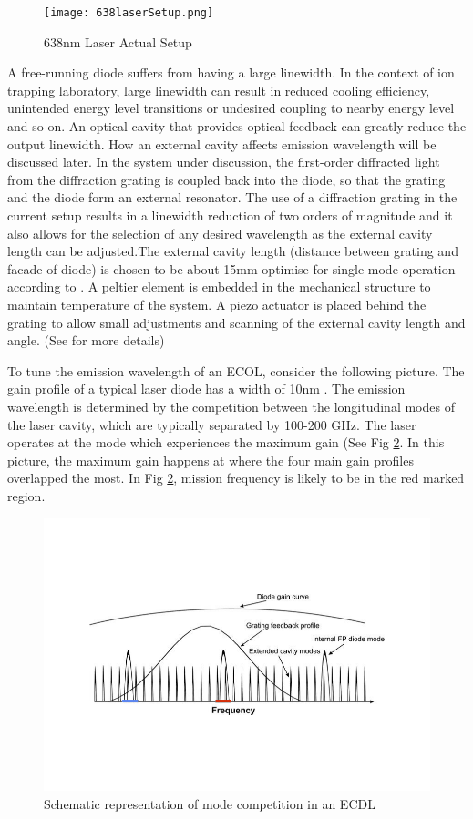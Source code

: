 \documentclass[12pt]{report}
\begin{document}
\begin{figure}[H]
    \centering
    \texttt{[image: 638laserSetup.png]}
    \caption{638nm Laser Actual Setup}
    \label{fig:638laserSetup}
\end{figure}

A free-running diode suffers from having a large linewidth. In the context of ion trapping laboratory, large linewidth can result in reduced cooling efficiency, unintended energy level transitions or undesired coupling to nearby energy level and so on. An optical cavity that provides optical feedback can greatly reduce the output linewidth. How an external cavity affects emission wavelength will be discussed later. In the system under discussion, the first-order diffracted light from the diffraction grating is coupled back into the diode, so that the grating and the diode form an external resonator. The use of a diffraction grating in the current setup results in a linewidth reduction of two orders of magnitude and it also allows for the selection of any desired wavelength as the external cavity length can be adjusted\cite{compactGratingDiodeLaser}.The external cavity length (distance between grating and facade of diode) is chosen to be about 15mm optimise for single mode operation according to \cite{compactGratingDiodeLaser}. A peltier element is embedded in the mechanical structure to maintain temperature of the system. A piezo actuator is placed behind the grating to allow small adjustments and scanning of the external cavity length and angle. (See \cite{compactGratingDiodeLaser} for more details)
\par
To tune the emission wavelength of an ECOL, consider the following picture. The gain profile of a typical laser diode has a width of 10nm \cite{compactGratingDiodeLaser}. The emission wavelength is determined by the competition between the longitudinal modes of the laser cavity, which are typically separated by 100-200 GHz\cite{compactGratingDiodeLaser}. The laser operates at the mode which experiences the maximum gain (See Fig \ref{fig:diodeLaserGainCurve}. In this picture, the maximum gain happens at where the four main gain profiles overlapped the most. In Fig \ref{fig:diodeLaserGainCurve}, mission frequency is likely to be in the red marked region. 
\begin{figure}[H]
    \centering
    \includegraphics[width=.8\textwidth]{diodeLaserGainCurve.png}
    \caption{Schematic representation of mode competition in an ECDL\cite{DiodeLaserInducedFluorescenceForGas-PhaseDiagnostics}}
    \label{fig:diodeLaserGainCurve}
\end{figure}
\end{document}
